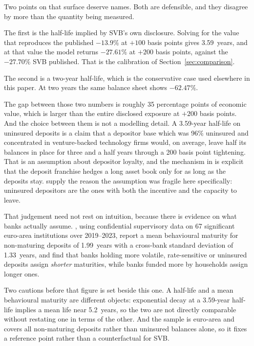 Two points on that surface deserve names. Both are defensible, and they disagree by
more than the quantity being measured.

The first is the half-life implied by SVB's own disclosure. Solving for the value that
reproduces the published $-13.9\%$ at $+100$ basis points gives 3.59~years, and at
that value the model returns $-27.61\%$ at $+200$ basis points, against the $-27.70\%$
SVB published. That is the calibration of Section~\ref{sec:comparison}.

The second is a two-year half-life, which is the conservative case used elsewhere in
this paper. At two years the same balance sheet shows $-62.47\%$.

The gap between those two numbers is roughly 35 percentage points of economic value,
which is larger than the entire disclosed exposure at $+200$ basis points. And the
choice between them is not a modelling detail. A 3.59-year half-life on uninsured
deposits is a claim that a depositor base which was 96\% uninsured and concentrated in
venture-backed technology firms would, on average, leave half its balances in place
for three and a half years through a 200 basis point tightening. That is an assumption
about depositor loyalty, and the mechanism in \citet{Drechsler2021} is explicit that
the deposit franchise hedges a long asset book only for as long as the deposits stay.
\citet{Jiang2024} supply the reason the assumption was fragile here specifically:
uninsured depositors are the ones with both the incentive and the capacity to leave.

That judgement need not rest on intuition, because there is evidence on what banks
actually assume. \citet{Coulier2025}, using confidential supervisory data on 67
significant euro-area institutions over 2019--2023, report a mean behavioural
maturity for non-maturing deposits of 1.99~years with a cross-bank standard deviation
of 1.33~years, and find that banks holding more volatile, rate-sensitive or uninsured
deposits assign \emph{shorter} maturities, while banks funded more by households
assign longer ones.

Two cautions before that figure is set beside this one. A half-life and a mean
behavioural maturity are different objects: exponential decay at a 3.59-year
half-life implies a mean life near 5.2~years, so the two are not directly comparable
without restating one in terms of the other. And the sample is euro-area and covers
all non-maturing deposits rather than uninsured balances alone, so it fixes a
reference point rather than a counterfactual for SVB.

